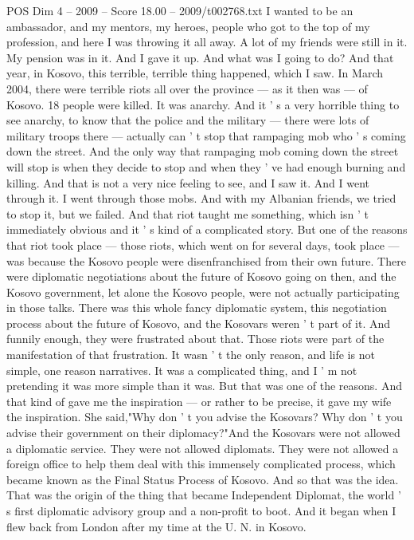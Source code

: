 \begin{textsample}{POS Dim 4 – 2009 – Score 18.00 – 2009/t002768.txt}
I wanted to be an ambassador, and my mentors, my heroes, people who got to the top of my profession, and here I was throwing it all away.
A lot of my friends were still in it.
My pension was in it.
And I gave it up.
And what was I going to do?
And that year, in Kosovo, this terrible, terrible thing happened, which I saw.
In March 2004, there were terrible riots all over the province — as it then was — of Kosovo. 18 people were killed.
It was anarchy.
And it ' s a very horrible thing to see anarchy, to know that the police and the military — there were lots of military troops there — actually can ' t stop that rampaging mob who ' s coming down the street.
And the only way that rampaging mob coming down the street will stop is when they decide to stop and when they ' ve had enough burning and killing.
And that is not a very nice feeling to see, and I saw it.
And I went through it.
I went through those mobs.
And with my Albanian friends, we tried to stop it, but we failed.
And that riot taught me something, which isn ' t immediately obvious and it ' s kind of a complicated story.
But one of the reasons that riot took place — those riots, which went on for several days, took place — was because the Kosovo people were disenfranchised from their own future.
There were diplomatic negotiations about the future of Kosovo going on then, and the Kosovo government, let alone the Kosovo people, were not actually participating in those talks.
There was this whole fancy diplomatic system, this negotiation process about the future of Kosovo, and the Kosovars weren ' t part of it.
And funnily enough, they were frustrated about that.
Those riots were part of the manifestation of that frustration.
It wasn ' t the only reason, and life is not simple, one reason narratives.
It was a complicated thing, and I ' m not pretending it was more simple than it was.
But that was one of the reasons.
And that kind of gave me the inspiration — or rather to be precise, it gave my wife the inspiration.
She said,"Why don ' t you advise the Kosovars?
Why don ' t you advise their government on their diplomacy?"And the Kosovars were not allowed a diplomatic service.
They were not allowed diplomats.
They were not allowed a foreign office to help them deal with this immensely complicated process, which became known as the Final Status Process of Kosovo.
And so that was the idea.
That was the origin of the thing that became Independent Diplomat, the world ' s first diplomatic advisory group and a non-profit to boot.
And it began when I flew back from London after my time at the U.
N. in Kosovo.

\end{textsample}
